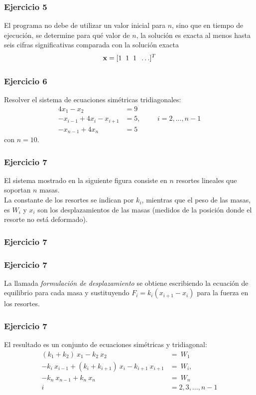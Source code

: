 \begin{frame}
\frametitle{Ejercicio 5}
El programa no debe de utilizar un valor inicial para $n$, sino que en tiempo de ejecución, se determine para qué valor de $n$, la solución es exacta al menos hasta seis cifras significativas comparada con la solución exacta
\[\mathbf{x} = [1 \hspace{0.2cm} 1 \hspace{0.2cm} 1 \hspace{0.2cm} \ldots ]^{T} \]
\end{frame}
\begin{frame}
\frametitle{Ejercicio 6}
Resolver el sistema de ecuaciones simétricas tridiagonales:
\begin{align*}
4 x_{1} - x_{2} &= 9 \\
-x_{i-1} + 4x_{i} - x_{i+1} &= 5, \hspace{1cm} i=2,\ldots,n-1 \\
-x_{n-1} + 4 x_{n} &= 5
\end{align*}
con $n=10$.
\end{frame}
\begin{frame}
\frametitle{Ejercicio 7}
El sistema mostrado en la siguiente figura consiste en $n$ resortes lineales que soportan $n$ masas.
\\
\bigskip
La constante de los resortes se indican por $k_{i}$, mientras que el peso de las masas, es $W_{i}$ y $x_{i}$ son los desplazamientos de las masas (medidos de la posición donde el resorte no está deformado).
\end{frame}
\begin{frame}
\frametitle{Ejercicio 7}
\begin{figure}[H]
	\centering
	
\end{figure}
\end{frame}
\begin{frame}
\frametitle{Ejercicio 7}
La llamada \emph{formulación de desplazamiento} se obtiene escribiendo la ecuación de equilibrio para cada masa y sustituyendo $F_{i} = k_{i}(x_{i + 1} - x_{i})$ para la fuerza en los resortes. 
\end{frame}
\begin{frame}
\frametitle{Ejercicio 7}
El resultado es un conjunto de ecuaciones simétricas y tridiagonal:
\fontsize{12}{12}\selectfont
\begin{align*}
(k_{1} + k_{2}) \: x_{1} - k_{2} \: x_{2} &= \: W_{1} \\
-k_{i} \: x_{i-1} + (k_{i} + k_{i+1}) \: x_{i} - k_{i+1} \: x_{i+1} &= \:  W_{i}, \\
-k_{n} \:  x_{n-1} + k_{n} \: x_{n} &= \: W_{n} \\
i &= 2, 3, \ldots, n-1
\end{align*}
\end{frame}
